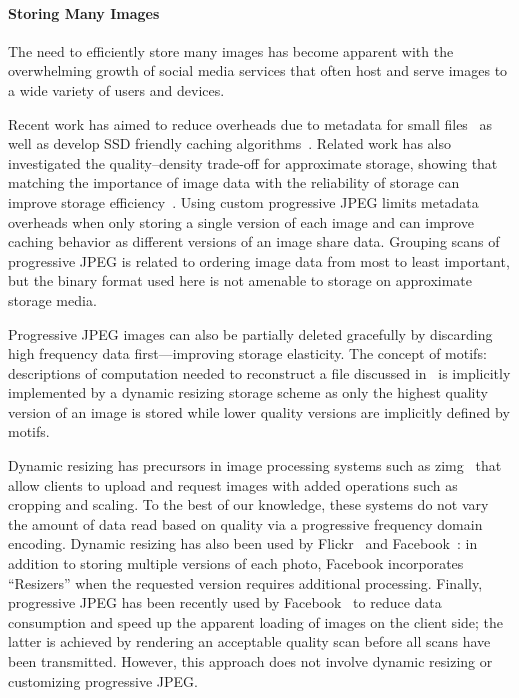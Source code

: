 \paragraph{Storing Many Images}
The need to efficiently store many images has become apparent with the overwhelming growth of social media services that often host and serve images to a wide variety of users and devices.

Recent work has aimed to reduce overheads due to metadata for small files~\cite{beaver2010finding} as well as develop SSD friendly caching algorithms~\cite{tang2015ripq}. 
Related work has also investigated the quality--density trade-off for approximate storage, showing that matching the importance of image data with the reliability of storage can improve storage efficiency~\cite{guo2016high}. 
Using custom progressive JPEG limits metadata overheads when only storing a single version of each image and can improve caching behavior as different versions of an image share data.
Grouping scans of progressive JPEG is related to ordering image data from most to least important, but the binary format used here is not amenable to storage on approximate storage media.

Progressive JPEG images can also be partially deleted gracefully by discarding high frequency data first---improving storage elasticity.
The concept of motifs: descriptions of computation needed to reconstruct a file discussed in~\cite{183605, carillon} is implicitly implemented by a dynamic resizing storage scheme as only the highest quality version of an image is stored while lower quality versions are implicitly defined by motifs.

Dynamic resizing has precursors in image processing systems such as zimg~\cite{zimg} that allow clients to upload and request images with added operations such as cropping and scaling. 
To the best of our knowledge, these systems do not vary the amount of data read based on quality via a progressive frequency domain encoding.
Dynamic resizing has also been used by Flickr~\cite{flickr} and Facebook~\cite{huang2013analysis}: in addition to storing multiple versions of each photo, Facebook incorporates ``Resizers'' when the requested version requires additional processing.
Finally, progressive JPEG has been recently used by Facebook~\cite{fasterfacebook} to reduce data consumption and speed up the apparent loading of images on the client side; the latter is achieved by rendering an acceptable quality scan before all scans have been transmitted. However, this approach does not involve dynamic resizing or customizing progressive JPEG\@.

